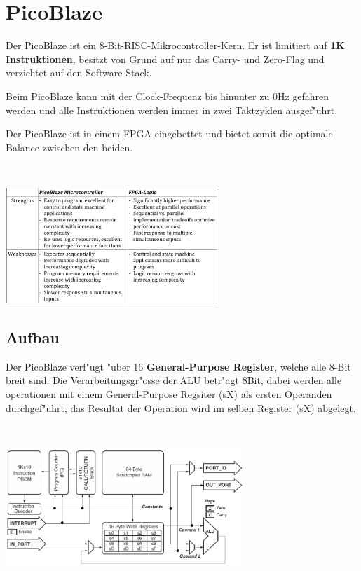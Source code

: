 \section{PicoBlaze}
\begin{minipage}{9cm}
	\vspace{-4ex}
	Der PicoBlaze ist ein 8-Bit-RISC-Mikrocontroller-Kern. Er ist limitiert auf \textbf{1K Instruktionen}, besitzt von Grund auf nur das Carry- und Zero-Flag und verzichtet auf den Software-Stack.

Beim PicoBlaze kann mit der Clock-Frequenz bis hinunter zu 0Hz gefahren werden und alle Instruktionen werden immer in zwei Taktzyklen ausgef"uhrt.

Der PicoBlaze ist in einem FPGA eingebettet und bietet somit die optimale Balance zwischen den beiden.
\end{minipage}
%
\begin{minipage}{0.5cm}
	\ \
\end{minipage}
%
\begin{minipage}{8cm}
	\includegraphics[width=8cm]{pics/PicoBlaze-Pro-Cons}
\end{minipage}

\subsection{Aufbau} 
\begin{minipage}{9cm}
	\vspace{-12ex}
	Der PicoBlaze verf"ugt "uber 16 \textbf{General-Purpose Register}, welche alle 8-Bit breit sind.
 	Die Verarbeitungsgr"osse der ALU betr"agt 8Bit, dabei werden alle operationen mit einem General-Purpose Regsiter (sX) als ersten Operanden durchgef"uhrt, das Resultat der Operation wird im selben Register (sX) abgelegt.
\end{minipage}
%
\begin{minipage}{0.5cm}
	\ \
\end{minipage}
%
\begin{minipage}{9cm}
	\includegraphics[width=9cm]{pics/PicoBlaze-Aufbau}
\end{minipage}
  
